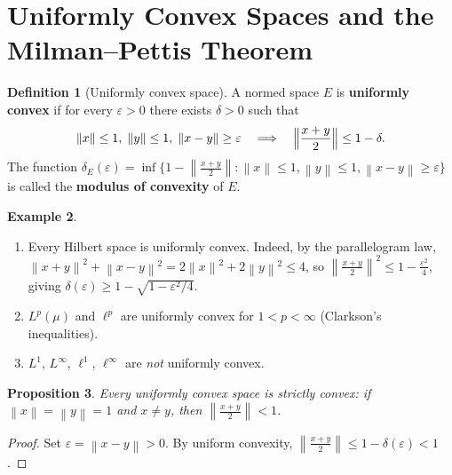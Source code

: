 \documentclass[a4paper,12pt]{book}
\newcommand{\norm}[1]{\left\| #1 \right\|}
\theoremstyle{definition}
\newtheorem{definition}{Definition}[chapter]
\newtheorem{example}[definition]{Example}
\theoremstyle{plain}
\newtheorem{proposition}[definition]{Proposition}
\theoremstyle{remark}
\begin{document}
\section{Uniformly Convex Spaces and the Milman--Pettis Theorem}%
\label{sec:uniform-convexity}

\begin{definition}[Uniformly convex space]\label{def:uniformly-convex}
A normed space $E$ is \textbf{uniformly convex} if for every $\varepsilon>0$
there exists $\delta>0$ such that
\[
  \norm{x}\le 1,\;\norm{y}\le 1,\;\norm{x-y}\ge\varepsilon
  \quad\Longrightarrow\quad
  \Bigl\|\frac{x+y}{2}\Bigr\| \le 1-\delta.
\]
The function $\delta_E(\varepsilon) = \inf\bigl\{1-\norm{\frac{x+y}{2}}:
\norm{x}\le 1,\norm{y}\le 1,\norm{x-y}\ge\varepsilon\bigr\}$
is called the \textbf{modulus of convexity} of $E$.
\end{definition}

\begin{example}\label{ex:uniformly-convex}
\leavevmode
\begin{enumerate}[label=(\roman*)]
  \item Every Hilbert space is uniformly convex.  Indeed, by the parallelogram
        law,
        $\norm{x+y}^2 + \norm{x-y}^2 = 2\norm{x}^2+2\norm{y}^2 \le 4$,
        so $\norm{\frac{x+y}{2}}^2 \le 1-\frac{\varepsilon^2}{4}$, giving
        $\delta(\varepsilon) \ge 1-\sqrt{1-\varepsilon^2/4}$.
  \item $L^p(\mu)$ and $\ell^p$ are uniformly convex for $1<p<\infty$
        (Clarkson's inequalities).
  \item $L^1$, $L^\infty$, $\ell^1$, $\ell^\infty$ are \emph{not} uniformly convex.
\end{enumerate}
\end{example}

\begin{proposition}\label{prop:uc-strictly-convex}
Every uniformly convex space is strictly convex: if $\norm{x}=\norm{y}=1$
and $x\ne y$, then $\norm{\frac{x+y}{2}}<1$.
\end{proposition}

\begin{proof}
Set $\varepsilon = \norm{x-y}>0$.  By uniform convexity,
$\norm{\frac{x+y}{2}}\le 1-\delta(\varepsilon)<1$.
\end{proof}
\end{document}
